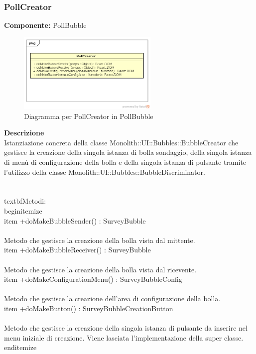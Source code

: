 \subsubsection{PollCreator}
\textbf{Componente:}  PollBubble\\
   \FloatBarrier
   \begin{figure}[ht]
   \centering
   \includegraphics[width=0.6\textwidth]{img/single-PollCreator}
   \caption{{Diagramma per PollCreator in PollBubble}}
\end{figure}
\FloatBarrier
\textbf{Descrizione}\\
Istanziazione concreta della classe Monolith::UI::Bubbles::BubbleCreator che gestisce la creazione della singola istanza di bolla sondaggio, della singola istanza di menù di configurazione della bolla e della singola istanza di pulsante tramite l'utilizzo della classe Monolith::UI::Bubbles::BubbleDiscriminator.
\\\\
\\textbf{Metodi:} 
\\begin{itemize}
\\item +doMakeBubbleSender() : SurveyBubble 
\\\\
Metodo che gestisce la creazione della bolla vista dal mittente.
\\item +doMakeBubbleReceiver() : SurveyBubble 
\\\\
Metodo che gestisce la creazione della bolla vista dal ricevente.
\\item +doMakeConfigurationMenu() : SurveyBubbleConfig 
\\\\
Metodo che gestisce la creazione dell'area di configurazione della bolla.
\\item +doMakeButton() : SurveyBubbleCreationButton 
\\\\
Metodo che gestisce la creazione della singola istanza di pulsante da inserire nel menu iniziale di creazione. Viene lasciata l'implementazione della super classe.
\\end{itemize} 


